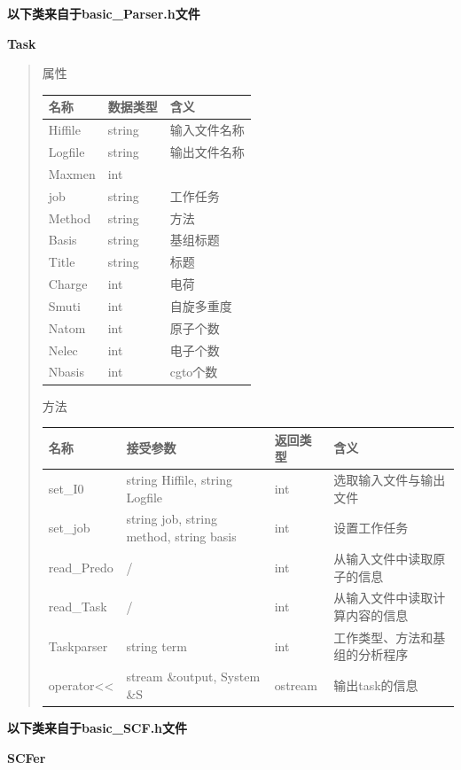 \documentclass[11pt]{article}
\begin{document}
\textbf{以下类来自于basic\_Parser.h文件}

\textbf{Task}

\begin{quote}
属性

\begin{longtable}[]{@{}lll@{}}
\toprule
名称 & 数据类型 & 含义\tabularnewline
\midrule
\endhead
Hiffile & string & 输入文件名称\tabularnewline
Logfile & string & 输出文件名称\tabularnewline
Maxmen & int &\tabularnewline
job & string & 工作任务\tabularnewline
Method & string & 方法\tabularnewline
Basis & string & 基组标题\tabularnewline
Title & string & 标题\tabularnewline
Charge & int & 电荷\tabularnewline
Smuti & int & 自旋多重度\tabularnewline
Natom & int & 原子个数\tabularnewline
Nelec & int & 电子个数\tabularnewline
Nbasis & int & cgto个数\tabularnewline
\bottomrule
\end{longtable}

方法

\begin{longtable}[]{@{}llll@{}}
\toprule
名称 & 接受参数 & 返回类型 & 含义\tabularnewline
\midrule
\endhead
set\_I0 & string Hiffile, string Logfile & int &
选取输入文件与输出文件\tabularnewline
set\_job & string job, string method, string basis & int &
设置工作任务\tabularnewline
read\_Predo & / & int & 从输入文件中读取原子的信息\tabularnewline
read\_Task & / & int & 从输入文件中读取计算内容的信息\tabularnewline
Taskparser & string term & int &
工作类型、方法和基组的分析程序\tabularnewline
operator\textless{}\textless{} & stream \&output, System \&S & ostream &
输出task的信息\tabularnewline
\bottomrule
\end{longtable}
\end{quote}

\textbf{以下类来自于basic\_SCF.h文件}

\textbf{SCFer}
\end{document}
